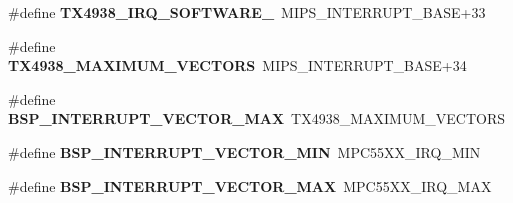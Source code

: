 \begin{DoxyCompactItemize}
\mbox{\label{group__bsp__interrupt_ga54c5c810239052ae400a181ace588011}} 
\#define {\bfseries T\+X4938\+\_\+\+I\+R\+Q\+\_\+\+S\+O\+F\+T\+W\+A\+R\+E\+\_}~M\+I\+P\+S\+\_\+\+I\+N\+T\+E\+R\+R\+U\+P\+T\+\_\+\+B\+A\+SE+33
\item 
\mbox{\label{group__bsp__interrupt_ga2a0d068d950b035281ef6b9a78042ba2}} 
\#define {\bfseries T\+X4938\+\_\+\+M\+A\+X\+I\+M\+U\+M\+\_\+\+V\+E\+C\+T\+O\+RS}~M\+I\+P\+S\+\_\+\+I\+N\+T\+E\+R\+R\+U\+P\+T\+\_\+\+B\+A\+SE+34
\item 
\mbox{\label{group__bsp__interrupt_gae4a2cdda5816a4c83c2fac0a49880c6e}} 
\#define {\bfseries B\+S\+P\+\_\+\+I\+N\+T\+E\+R\+R\+U\+P\+T\+\_\+\+V\+E\+C\+T\+O\+R\+\_\+\+M\+AX}~T\+X4938\+\_\+\+M\+A\+X\+I\+M\+U\+M\+\_\+\+V\+E\+C\+T\+O\+RS
\item 
\mbox{\label{group__bsp__interrupt_ga64cbb02dfea4d6923abccaa0087d2a0d}} 
\#define {\bfseries B\+S\+P\+\_\+\+I\+N\+T\+E\+R\+R\+U\+P\+T\+\_\+\+V\+E\+C\+T\+O\+R\+\_\+\+M\+IN}~M\+P\+C55\+X\+X\+\_\+\+I\+R\+Q\+\_\+\+M\+IN
\item 
\mbox{\label{group__bsp__interrupt_gae4a2cdda5816a4c83c2fac0a49880c6e}} 
\#define {\bfseries B\+S\+P\+\_\+\+I\+N\+T\+E\+R\+R\+U\+P\+T\+\_\+\+V\+E\+C\+T\+O\+R\+\_\+\+M\+AX}~M\+P\+C55\+X\+X\+\_\+\+I\+R\+Q\+\_\+\+M\+AX
\end{DoxyCompactItemize}
